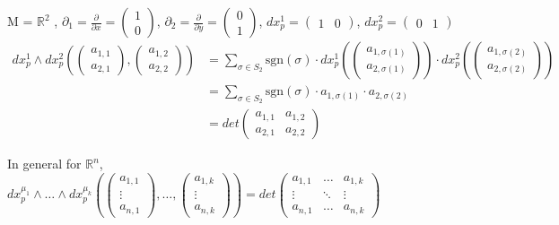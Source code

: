\documentclass[11pt]{book} %
\begin{document}
M = $\mathbb{R}^2$ , $\partial_1 = \frac{\partial}{\partial x} = \begin{pmatrix} 1 \\ 0 \end{pmatrix}$, $\partial_2 = \frac{\partial}{\partial y} = \begin{pmatrix} 0 \\ 1 \end{pmatrix}$, 
$dx_p^1 = \begin{pmatrix} 1 & 0 \end{pmatrix}$, $dx_p^2 = \begin{pmatrix} 0 & 1 \end{pmatrix}$ \\
\begin{align*}
    dx_p^1 \wedge dx_p^2 ( \begin{pmatrix} a_{1,1} \\ a_{2,1} \end{pmatrix}, \begin{pmatrix} a_{1,2} \\ a_{2,2} \end{pmatrix}) &=  
    \sum_{\sigma \in S_2} \text{sgn}(\sigma) \cdot dx_p^1(\begin{pmatrix} a_{1, \sigma(1)} \\ a_{2, \sigma(1)} \end{pmatrix}) \cdot dx_p^2(\begin{pmatrix} a_{1, \sigma(2)} \\ a_{2, \sigma(2)} \end{pmatrix}) 
    \\&= \sum_{\sigma \in S_2} \text{sgn}(\sigma) \cdot a_{1, \sigma(1)} \cdot a_{2, \sigma(2)} 
    \\&= det \begin{pmatrix} a_{1,1} & a_{1,2} \\ a_{2,1} & a_{2,2} \end{pmatrix}
\end{align*}

In general for $\mathbb{R}^n$, $dx_p^{\mu_1} \wedge \ldots \wedge dx_p^{\mu_k} ( \begin{pmatrix} a_{1,1} \\ \vdots \\ a_{n,1} \end{pmatrix}, \ldots, \begin{pmatrix} a_{1,k} \\ \vdots \\ a_{n,k} \end{pmatrix}) = det \begin{pmatrix} a_{1,1} & \ldots & a_{1,k} \\ \vdots & \ddots & \vdots \\ a_{n,1} & \ldots & a_{n,k} \end{pmatrix}$
\end{document}

